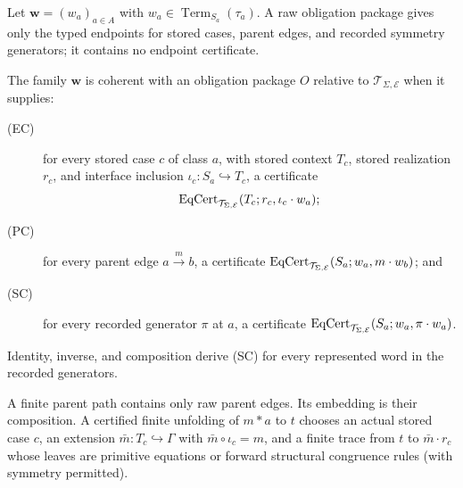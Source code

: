 Let $\mathbf w=(w_a)_{a\in A}$ with
$w_a\in\operatorname{Term}_{S_a}(\tau_a)$.  A raw obligation package gives
only the typed endpoints for stored cases, parent edges, and recorded
symmetry generators; it contains no endpoint certificate.
\begin{definition}
\label{def:eq-cert}
The family $\mathbf w$ is coherent with an obligation package $O$ relative to
$\mathcal T_{\Sigma,\mathcal E}$ when it supplies:
\begin{description}
\item[(EC)] for every stored case $c$ of class $a$, with stored context
$T_c$, stored realization $r_c$, and interface inclusion
$\iota_c:S_a\hookrightarrow T_c$, a certificate
\[
\operatorname{EqCert}_{\mathcal T_{\Sigma,\mathcal E}}(T_c;r_c,\iota_c\cdot w_a);
\]
\item[(PC)] for every parent edge $a\xrightarrow{m}b$, a certificate
$\operatorname{EqCert}_{\mathcal T_{\Sigma,\mathcal E}}(S_a;w_a,m\cdot w_b)$; and
\item[(SC)] for every recorded generator $\pi$ at $a$, a certificate
$\operatorname{EqCert}_{\mathcal T_{\Sigma,\mathcal E}}(S_a;w_a,\pi\cdot w_a)$.
\end{description}
Identity, inverse, and composition derive (SC) for every represented word in
the recorded generators.
\end{definition}

A finite parent path contains only raw parent edges.  Its embedding is their
composition.  A certified finite unfolding of $m*a$ to $t$ chooses an actual
stored case $c$, an extension $\bar m:T_c\hookrightarrow\Gamma$ with
$\bar m\circ\iota_c=m$, and a finite trace from $t$ to
$\bar m\cdot r_c$ whose leaves are primitive equations or forward structural
congruence rules (with symmetry permitted).

